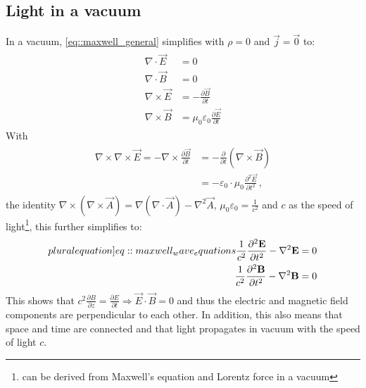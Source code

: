 \subsection{Light in a vacuum}
%
In a vacuum, \cref{eq::maxwell_general} simplifies with $\rho = 0$ and $\vec{j} = \vec{0}$ to:
%
\begin{align}
\begin{split} \label{eq::maxwell_vacuum}
  \nabla \cdot \vec{E} &= 0 \quad\\
  \nabla \cdot \vec{B} &= 0 \quad\\
  \nabla \times \vec{E} &= -\frac{\partial\vec B}{\partial t}\\
  \nabla \times \vec{B} &= \mu_0\varepsilon_0 \frac{\partial\vec E}{\partial t}
  \end{split}
\end{align}
%
With
\begin{align}
\begin{split}
    \nabla \times \nabla \times \vec{E} = -\nabla \times \frac{\partial \vec{B}} {\partial t} &= -\frac{\partial} {\partial t} \left( \nabla \times  \vec{B} \right)\\
    &= -\varepsilon_0 \cdot \mu_0 \frac{\partial^2 \vec{E}}{\partial t^2} \, ,
\end{split}
\end{align}
%
the identity $\nabla \times \left( \nabla \times \vec{A} \right) = \nabla(\nabla \cdot \vec{A}) - \nabla^{2}\vec{A}$, $\mu_0\varepsilon_0 = \frac{1}{c^2}$ and $c$ as the speed of light\footnote{can be derived from Maxwell's equation and Lorentz force in a vacuum}, this further simplifies to:
%
\begin{align}
\begin{split} \label[pluralequation]{eq::maxwell_wave_equations}
  \frac{1}{c^2} \frac{\partial^2 \vec{E}}{\partial t^2} - \nabla^2 \vec{E} &= 0 \\
  \frac{1}{c^2} \frac{\partial^2 \vec{B}}{\partial t^2} - \nabla^2 \vec{B} &= 0
\end{split}
\end{align}
%
This shows that $c^2 \frac{\partial B} {\partial z} = \frac{\partial E}{\partial t} \Rightarrow \vec{E} \cdot \vec{B} = 0$ and thus the electric and magnetic field components are perpendicular to each other.
In addition, this also means that space and time are connected and that light propagates in vacuum with the speed of light $c$.
%
